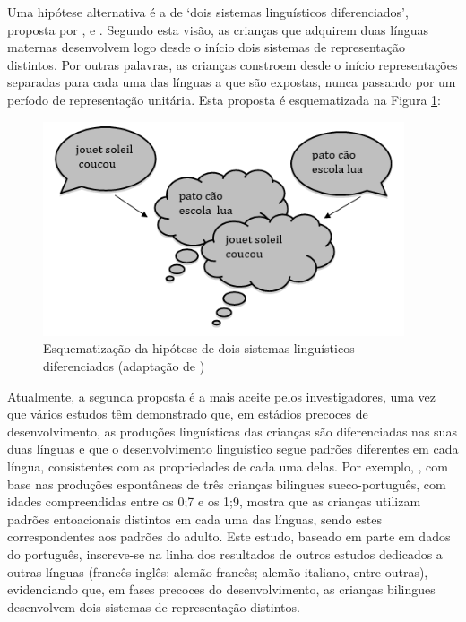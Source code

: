 \documentclass[output=paper]{LSP/langsci}
\begin{document}
Uma hipótese alternativa é a de ‘dois sistemas linguísticos diferenciados’, proposta por \citet{genesee1989}, \cite{leisel1989} e \cite{dehouwer1990}. Segundo esta visão, as crianças que adquirem duas línguas maternas desenvolvem logo desde o início dois sistemas de representação distintos. Por outras palavras, as crianças constroem desde o início representações separadas para cada uma das línguas a que são expostas, nunca passando por um período de representação unitária. Esta proposta é esquematizada na Figura \ref{fig:almeida_2}:

\begin{figure}
\includegraphics[width=0.95\textwidth]{figures/almeida_2}
\caption{Esquematização da hipótese de dois sistemas linguísticos diferenciados (adaptação de \citealt{genesee_etal2004})}
\label{fig:almeida_2}
\end{figure}

Atualmente, a segunda proposta é a mais aceite pelos investigadores, uma vez que vários estudos têm demonstrado que, em estádios precoces de desenvolvimento, as produções linguísticas das crianças são diferenciadas nas suas duas línguas e que o desenvolvimento linguístico segue padrões diferentes em cada língua, consistentes com as propriedades de cada uma delas. Por exemplo, \cite{cruz-ferreira2003}, com base nas produções espontâneas de três crianças bilingues sueco-português, com idades compreendidas entre os 0;7 e os 1;9, mostra que as crianças utilizam padrões entoacionais distintos em cada uma das línguas, sendo estes correspondentes aos padrões do adulto. Este estudo, baseado em parte em dados do português, inscreve-se na linha dos resultados de outros estudos dedicados a outras línguas (francês-inglês; alemão-francês; alemão-italiano, entre outras), evidenciando que, em fases precoces do desenvolvimento, as crianças bilingues desenvolvem dois sistemas de representação distintos.
\end{document}
